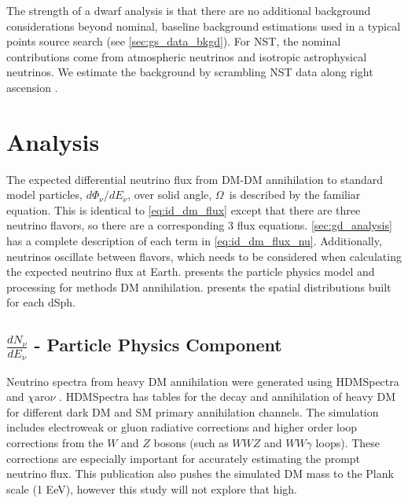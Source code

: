 The strength of a dwarf analysis is that there are no additional background considerations beyond nominal, baseline background estimations used in a typical points source search (see \cref{sec:gs_data_bkgd}).
For NST, the nominal contributions come from atmospheric neutrinos and isotropic astrophysical neutrinos.
We estimate the background by scrambling NST data along right ascension \cite{IC3_thesis_Cerver,HE_muon_thesis_IC3,IC_NGC1068}.

\section{Analysis}\label{sec:icDM_analysis}

The expected differential neutrino flux from DM-DM annihilation to standard model
particles, $d\Phi_{\nu}/dE_{\nu}$, over solid angle, $\Omega$~is described by the familiar equation.
\iddmannilationNu
This is identical to \cref{eq:id_dm_flux} except that there are three neutrino flavors, so there are a corresponding 3 flux equations.
\cref{sec:gd_analysis} has a complete description of each term in \cref{eq:id_dm_flux_nu}.
Additionally, neutrinos oscillate between flavors, which needs to be considered when calculating the expected neutrino flux at Earth.
 presents the particle physics model and processing for methods DM annihilation.
 presents the spatial distributions built for each dSph.

\subsection{$\frac{dN_\nu}{dE_\nu}$ - Particle Physics Component}\label{sec:icDM_particlephysics}

Neutrino spectra from heavy DM annihilation were generated using HDMSpectra \cite{Rodd:HDM_spec} and $\chi \textrm{aro}\nu$ \cite{Charon}.
HDMSpectra has tables for the decay and annihilation of heavy DM for different dark DM and SM primary annihilation channels.
The simulation includes electroweak or gluon radiative corrections and higher order loop corrections from the $W$ and $Z$ bosons (such as $WWZ$ and $WW\gamma$ loops).
These corrections are especially important for accurately estimating the prompt neutrino flux.
This publication also pushes the simulated DM mass to the Plank scale (1 EeV), however this study will not explore that high.

